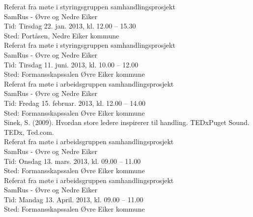 \documentclass[11pt]{report} %
\begin{document}
\begin{thebibliography}{99}
                  Referat fra møte i styringsgruppen samhandlingsprosjekt\\ 
                  SamRus - Øvre og Nedre Eiker\\
                  Tid: Tirsdag 22. jan. 2013,  kl. 12.00 – 15.30\\
                  Sted: Portåsen, Nedre Eiker kommune\\

                  Referat fra møte i styringsgruppen samhandlingsprosjekt\\ 
                  SamRus - Øvre og Nedre Eiker\\
                  Tid: Tirsdag 11. juni. 2013,  kl. 10.00 – 12.00\\
                  Sted: Formansskapssalen Øvre Eiker kommune\\

                  Referat fra møte i arbeidsgruppen samhandlingsprosjekt\\ 
                  SamRus - Øvre og Nedre Eiker\\
                  Tid: Fredag 15. februar. 2013,  kl. 12.00 – 14.00\\
                  Sted: Formansskapssalen Øvre Eiker kommune\\

                  Sinek, S. (2009). Hvordan store ledere inspirerer til handling. TEDxPuget Sound. TEDx, Ted.com.\\

                  Referat fra møte i arbeidsgruppen samhandlingsprosjekt\\ 
                  SamRus - Øvre og Nedre Eiker\\
                  Tid: Onsdag 13. mars. 2013,  kl. 09.00 – 11.00\\
                  Sted: Formansskapssalen Øvre Eiker kommune\\

                  Referat fra møte i arbeidsgruppen samhandlingsprosjekt\\ 
                  SamRus - Øvre og Nedre Eiker\\
                  Tid: Mandag 13. April. 2013,  kl. 09.00 – 11.00\\
                  Sted: Formansskapssalen Øvre Eiker kommune\\


\end{thebibliography}
\end{document}
